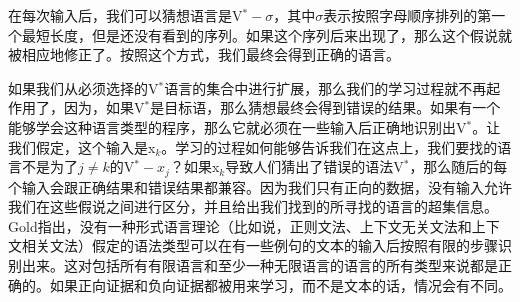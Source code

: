 \noindent
在每次输入后，我们可以猜想语言是V$^* - \sigma$，其中$\sigma$表示按照字母顺序排列的第一个最短长度，但是还没有看到的序列。如果这个序列后来出现了，那么这个假说就被相应地修正了。按照这个方式，我们最终会得到正确的语言。

如果我们从必须选择的V$^*$语言的集合中进行扩展，那么我们的学习过程就不再起作用了，因为，如果V$^*$是目标语，那么猜想最终会得到错误的结果。如果有一个能够学会这种语言类型的程序，那么它就必须在一些输入后正确地识别出V$^*$。让我们假定，这个输入是x$_k$。学习的过程如何能够告诉我们在这点上，我们要找的语言不是为了$j \neq k$的V$^* - x_j$？如果x$_k$导致人们猜出了错误的语法V$^*$，那么随后的每个输入会跟正确结果和错误结果都兼容。因为我们只有正向的数据，没有输入允许我们在这些假说之间进行区分，并且给出我们找到的所寻找的语言的超集信息。Gold指出，没有一种形式语言理论（比如说，正则文法、上下文无关文法和上下文相关文法）假定的语法类型可以在有一些例句的文本的输入后按照有限的步骤识别出来。这对包括所有有限语言和至少一种无限语言的语言的所有类型来说都是正确的。如果正向证据和负向证据都被用来学习，而不是文本的话，情况会有不同。

